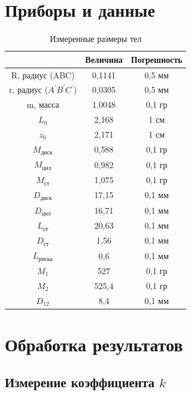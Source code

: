 \documentclass[a4paper]{article}
\begin{document}
 
    \section{Приборы и данные}

    \begin{table}[!h]
    \begin{center}
\begin{tabular}{|c|c|c|}
\hline
                   & Величина & Погрешность \\ \hline
R, радиус (ABC)    & 0,1141   & 0,5 мм      \\ \hline
r, радиус ($A^{'}B^{'}C^{'}$) & 0,0305   & 0,5 мм      \\ \hline
m, масса           & 1,0048   & 0,1 гр      \\ \hline
$L_{0}$            & 2,168    & 1 см        \\ \hline
$z_{0}$            & 2,171    & 1 см        \\ \hline
$M_{\text{диск}}$  & 0,588    & 0,1 гр      \\ \hline
$M_{\text{цил}}$   & 0,982    & 0,1 гр      \\ \hline
$M_{\text{ст}}$    & 1,075    & 0,1 гр      \\ \hline
$D_{\text{диск}}$  & 17,15    & 0,1 мм      \\ \hline
$D_{\text{цил}}$   & 16,71    & 0,1 мм      \\ \hline
$L_{\text{ст}}$    & 20,63    & 0,1 мм      \\ \hline
$D_{\text{ст}}$    & 1,56     & 0,1 мм      \\ \hline
$L_{\text{риска}}$ & 0,6      & 0,1 мм      \\ \hline
$M_{1}$            & 527      & 0,1 гр      \\ \hline
$M_{2}$            & 525,4    & 0,1 гр      \\ \hline
$D_{12}$           & 8,4      & 0,1 мм      \\ \hline
\end{tabular}
\caption{Измеренные размеры тел}
\end{center}
\end{table}
    
    \section{Обработка результатов}

    \subsection{Измерение коэффициента $k$}
\end{document}

